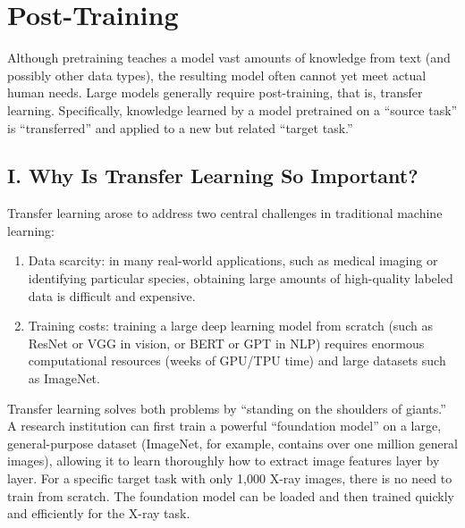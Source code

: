 \setcounter{section}{3}

\hypertarget{post-training}{%
\section{Post-Training}\label{post-training}}

Although pretraining teaches a model vast amounts of knowledge from text (and possibly other data types), the resulting model often cannot yet meet actual human needs. Large models generally require post-training, that is, transfer learning. Specifically, knowledge learned by a model pretrained on a ``source task'' is ``transferred'' and applied to a new but related ``target task.''

\hypertarget{i.-why-is-transfer-learning-so-important}{%
\subsection{I. Why Is Transfer Learning So Important?}\label{i.-why-is-transfer-learning-so-important}}

Transfer learning arose to address two central challenges in traditional machine learning:

\begin{enumerate}
\def\labelenumi{\arabic{enumi}.}
\item
  Data scarcity: in many real-world applications, such as medical imaging or identifying particular species, obtaining large amounts of high-quality labeled data is difficult and expensive.
\item
  Training costs: training a large deep learning model from scratch (such as ResNet or VGG in vision, or BERT or GPT in NLP) requires enormous computational resources (weeks of GPU/TPU time) and large datasets such as ImageNet.
\end{enumerate}

Transfer learning solves both problems by ``standing on the shoulders of giants.'' A research institution can first train a powerful ``foundation model'' on a large, general-purpose dataset (ImageNet, for example, contains over one million general images), allowing it to learn thoroughly how to extract image features layer by layer. For a specific target task with only 1,000 X-ray images, there is no need to train from scratch. The foundation model can be loaded and then trained quickly and efficiently for the X-ray task.

